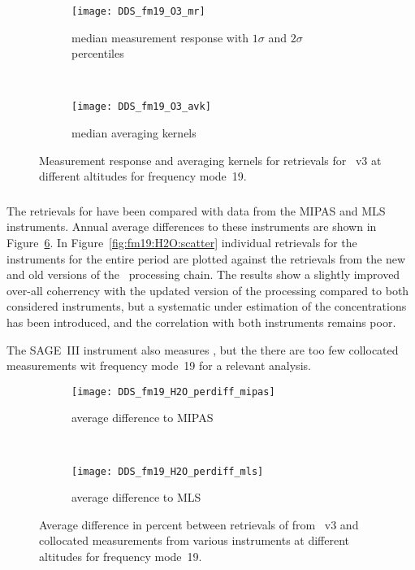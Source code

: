 \begin{figure}[htpb]
    \centering
    \begin{subfigure}[b]{0.49\textwidth}
        \texttt{[image: DDS\_fm19\_O3\_mr]}
        \caption{median measurement response with $1\sigma$ and $2\sigma$
        percentiles}
        \label{fig:fm19:O3:mr}
    \end{subfigure}
    \,
    \begin{subfigure}[b]{0.49\textwidth}
        \texttt{[image: DDS\_fm19\_O3\_avk]}
        \caption{median averaging kernels\newline~}
        \label{fig:fm19:O3:avk}
    \end{subfigure}
    \caption{Measurement response and averaging kernels for 
    retrievals for \smr~v3 at different altitudes for frequency mode~19.}
    \label{fig:fm19:O3:mr_avk}
\end{figure}



\subsubsection{}
\label{sec:fm19:comparison:H2O}
The retrievals for  have been compared with data from the MIPAS and
MLS instruments.  Annual average differences to these instruments are shown in
Figure~\ref{fig:fm19:H2O:profiles}. In Figure~\ref{fig:fm19:H2O:scatter}
individual retrievals for the instruments for the entire period are plotted
against the retrievals from the new and old versions of the \smr\ processing
chain. The results show a slightly improved over-all coherrency with the
updated version of the processing compared to both considered instruments, but
a systematic under estimation of the concentrations has been introduced, and
the correlation with both instruments remains poor.

The SAGE~III instrument also measures , but the there are too few
collocated measurements wit frequency mode~19 for a relevant analysis.

\begin{figure}[htpb]
    \centering
    \begin{subfigure}[b]{0.49\textwidth}
        \texttt{[image: DDS\_fm19\_H2O\_perdiff\_mipas]}
        \caption{average difference to MIPAS}
        \label{fig:fm19:H2O:profiles:MIPAS}
    \end{subfigure}
    \,
    \begin{subfigure}[b]{0.49\textwidth}
        \texttt{[image: DDS\_fm19\_H2O\_perdiff\_mls]}
        \caption{average difference to MLS}
        \label{fig:fm19:H2O:profiles:MLS}
    \end{subfigure}
    \caption{Average difference in percent between retrievals of 
    from \smr~v3 and collocated measurements from various instruments at
    different altitudes for frequency mode~19.}

    \label{fig:fm19:H2O:profiles}
\end{figure}

